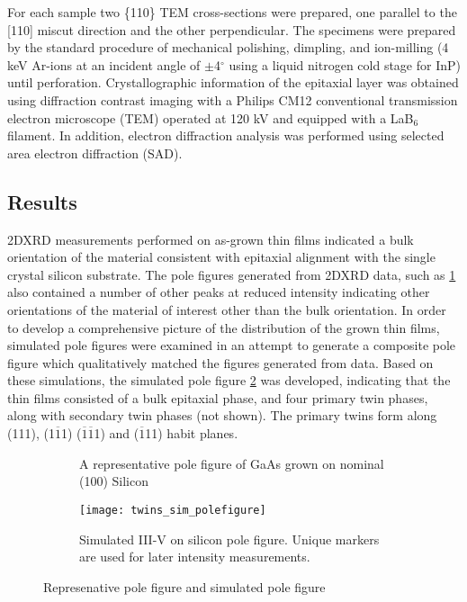 For each sample two \{110\} TEM cross-sections were prepared, one parallel to 
the [110] miscut direction and the other perpendicular. The specimens were 
prepared by the standard procedure of mechanical polishing, dimpling, and 
ion-milling (4 keV Ar-ions at an incident angle of $\pm$4$^\circ$ using a 
liquid nitrogen cold stage for InP) until perforation. Crystallographic 
information of the epitaxial layer was obtained using diffraction contrast 
imaging with a Philips CM12 conventional transmission electron microscope 
(TEM) operated at 120 kV and equipped with a LaB$_6$ filament. In addition, 
electron diffraction analysis was performed using selected area electron 
diffraction (SAD).
\subsection{Results}
2DXRD measurements performed on as-grown thin films indicated a bulk 
orientation of the material consistent with epitaxial alignment with the 
single crystal silicon substrate. The pole figures generated from 2DXRD data, 
such as \cref{fig:twins_pole_example} also contained a number of other peaks 
at reduced intensity indicating other orientations of the material of interest 
other than the bulk orientation. In order to develop a comprehensive picture 
of the distribution of the grown thin films, simulated pole figures were 
examined in an attempt to generate a composite pole figure which qualitatively 
matched the figures generated from data. Based on these simulations, the 
simulated pole figure \cref{fig:twins_sim_polefigure} was developed, 
indicating that the thin films consisted of a bulk epitaxial phase, and four 
primary twin phases, along with secondary twin phases (not shown). The primary twins form 
along (111), (1$\overline{1}$1) ($\overline{1}\overline{1}$1) and ($\overline{1}$11) 
habit planes.
\begin{figure}
    \begin{subfigure}[b]{0.5\linewidth}
        \centering
        \caption{A representative pole figure of GaAs grown on nominal (100) 
        Silicon\label{fig:twins_pole_example}}
    \end{subfigure}
    \begin{subfigure}[b]{0.5\linewidth}
        \centering
        \texttt{[image: twins\_sim\_polefigure]}
        \caption{Simulated III-V on silicon pole figure. Unique markers are used 
        for later intensity measurements.\label{fig:twins_sim_polefigure}}
    \end{subfigure}
    \caption{\label{fig:polefigure_example}Represenative pole figure and simulated pole 
    figure}
\end{figure}

